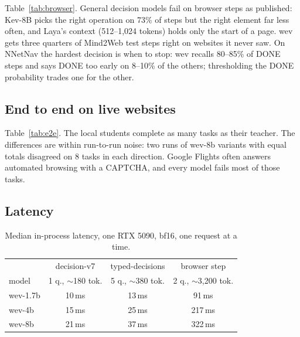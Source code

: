 \documentclass[11pt]{article}
\begin{document}
Table~\ref{tab:browser}. General decision models fail on browser steps as published: Kev-8B picks the right operation
on 73\% of steps but the right element far less often, and Laya's context (512--1{,}024 tokens) holds only the start
of a page. wev gets three quarters of Mind2Web test steps right on websites it never saw. On NNetNav the hardest
decision is when to stop: wev recalls 80--85\% of DONE steps and says DONE too early on 8--10\% of the others;
thresholding the DONE probability trades one for the other.

\subsection{End to end on live websites}

\begin{table}[t]
\centering\small
{}
\caption{Judge-verified task successes on held-out live-website tasks with jev-ultrafast.}
\label{tab:e2e}
\end{table}

Table~\ref{tab:e2e}. The local students complete as many tasks as their teacher. The differences are within
run-to-run noise: two runs of wev-8b variants with equal totals disagreed on 8 tasks in each direction. Google Flights
often answers automated browsing with a CAPTCHA, and every model fails most of those tasks.

\subsection{Latency}

\begin{table}[t]
\centering\small
\begin{tabular}{lccc}
\toprule
& decision-v7 & typed-decisions & browser step \\
model & 1 q., $\sim$180 tok. & 5 q., $\sim$380 tok. & 2 q., $\sim$3{,}200 tok. \\
\midrule
wev-1.7b & 10\,ms & 13\,ms & 91\,ms \\
wev-4b & 15\,ms & 25\,ms & 217\,ms \\
wev-8b & 21\,ms & 37\,ms & 322\,ms \\
\bottomrule
\end{tabular}
\caption{Median in-process latency, one RTX 5090, bf16, one request at a time.}
\label{tab:latency}
\end{table}
\end{document}
